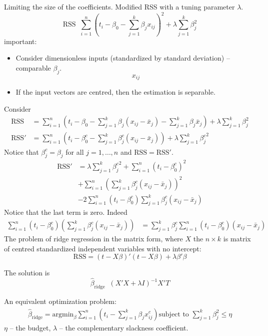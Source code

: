 \documentclass[a4paper]{article}
\newcommand{\brac}[1]{{\left ( #1 \right )}}
\newcommand{\RSS}{{\text{RSS}}}
\newcommand{\defn}{\mathop{\overset{\Delta}{=}}\nolimits}
\begin{document}
Limiting the size of the coefficients. Modified RSS with a tuning parameter $\lambda$.
\[\RSS\defn \sum_{i=1}^n \brac{t_i - \beta_0 - \sum_{j=1}^k \beta_j x_{ij}}^2 + \lambda \sum_{j=1}^k \beta_j^2\]
important: \begin{itemize}
	\item Consider dimensionless inputs (standardized by standard deviation) -- comparable $\beta_j$.
	\[x_{ij}\]
	\item If the input vectors are centred, then the estimation is separable.
\end{itemize}
Consider \begin{align*}
	\RSS &= \sum_{i=1}^n \brac{t_i - \beta_0 - \sum_{j=1}^k \beta_j \brac{x_{ij}-\bar{x}_j} - \sum_{j=1}^k \beta_j \bar{x}_j}  + \lambda \sum_{j=1}^k \beta_j^2 \\
	\RSS' &= \sum_{i=1}^n \brac{t_i - \beta_0^c - \sum_{j=1}^k \beta_j^c \brac{x_{ij}-\bar{x}_j}}  + \lambda \sum_{j=1}^k {\beta_j^c}^2
\end{align*}
Notice that $\beta_j^c = \beta_j$ for all $j=1,\ldots,n$ and $\RSS=\RSS'$.
\begin{align*}
	\RSS' &= \lambda \sum_{j=1}^k {\beta_j^c}^2 + \sum_{i=1}^n \brac{t_i - \beta_0^c}^2 \\
	& + \sum_{i=1}^n \brac{\sum_{j=1}^k \beta_j^c \brac{x_{ij}-\bar{x}_j}}^2 \\
	& - 2 \sum_{i=1}^n \brac{t_i - \beta_0^c} \sum_{j=1}^k \beta_j^c \brac{x_{ij}-\bar{x}_j}
\end{align*}
Notice that the last term is zero. Indeed \begin{align*}
	\sum_{i=1}^n \brac{t_i - \beta_0^c} \brac{\sum_{j=1}^k \beta_j^c \brac{x_{ij}-\bar{x}_j}}
	& = \sum_{j=1}^k \beta_j^c \sum_{i=1}^n \brac{t_i - \beta_0^c} \brac{x_{ij}-\bar{x}_j}
\end{align*}
The problem of ridge regression in the matrix form, where $X$ the $n\times k$
is matrix of centred standardized independent variables with no intercept:
\[\RSS = \brac{t-X\beta}'\brac{t-X\beta} + \lambda \beta'\beta\]

The solution is
\[\hat{\beta}_{\text{ridge}}\defn \brac{X'X + \lambda I}^{-1} X'T\]

An equivalent optimization problem:
\begin{align*}
	\hat{\beta}_{\text{ridge}} = \text{argmin}_{\beta} \sum_{i=1}^n \brac{t_i - \sum_{j=1}^k \beta_j x_{ij}^c}
	\text{subject to } \sum_{j=1}^k \beta_j^2 \leq \eta
\end{align*}
$\eta$ -- the budget, $\lambda$ -- the complementary slackness coefficient.
\end{document}
